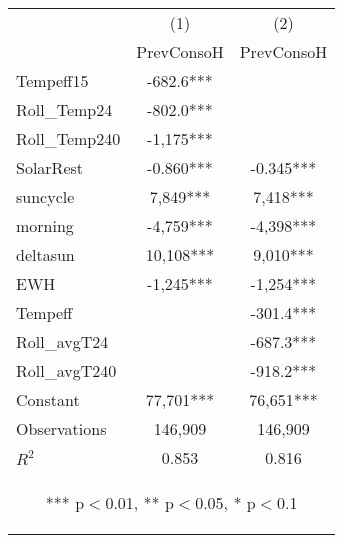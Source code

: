 \begin{center}
\begin{tabular}{lcc} \toprule
 & (1) & (2) \\
\textcolor{white}{VARIABLES} & PrevConsoH & PrevConsoH \\ \midrule
Tempeff15 & -682.6*** &  \\
Roll\_Temp24 & -802.0*** &  \\
Roll\_Temp240 & -1,175*** &  \\
SolarRest & -0.860*** & -0.345*** \\
suncycle & 7,849*** & 7,418*** \\
morning & -4,759*** & -4,398*** \\
deltasun & 10,108*** & 9,010*** \\
EWH & -1,245*** & -1,254*** \\
Tempeff &  & -301.4*** \\
Roll\_avgT24 &  & -687.3*** \\
Roll\_avgT240 &  & -918.2*** \\
Constant & 77,701*** & 76,651*** \\
\midrule Observations & 146,909 & 146,909 \\
 $R^2$ & 0.853 & 0.816 \\ \bottomrule
\multicolumn{3}{c}{\begin{footnotesize} *** p$<$0.01, ** p$<$0.05, * p$<$0.1\end{footnotesize}} \\
\end{tabular}
\end{center}
